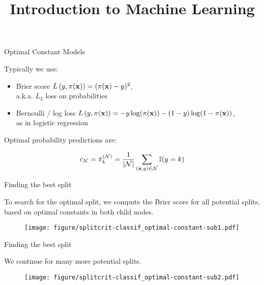 \documentclass[11pt,compress,t,notes=noshow, xcolor=table]{beamer}
\title{Introduction to Machine Learning}
\institute{\href{https://compstat-lmu.github.io/lecture_i2ml/}{compstat-lmu.github.io/lecture\_i2ml}}
\date{}
\begin{document}
\sloppy

\begin{vbframe}{Optimal Constant Models}

Typically we use: 

\begin{itemize}
\item Brier score $L\left(y, \pi(\mathbf{x})\right) = (\pi(\mathbf{x}) - y)^2$,\\ a.k.a. $L_2$ loss on probabilities
\item  Bernoulli / log loss $L\left(y, \pi(\mathbf{x})\right) = -y\log(\pi(\mathbf{x}))-(1-y)\log(1-\pi(\mathbf{x}))$, \\
as in logistic regression
\end{itemize}


Optimal probability predictions are:

$$c_{\mathcal{N}} = \hat\pi_k^{(\mathcal{N})} = \frac{1}{|\mathcal{N}|} \sum\limits_{(\mathbf{x},y) \in \mathcal{N}} \mathbb{I}(y = k)$$ 



\end{vbframe}


\begin{frame}[b]{Finding the best split}

To search for the optimal split, we compute the Brier score for all potential splits, based on optimal constants in both child nodes.

\vspace{0.5cm}

\begin{figure}[b]
    \centering
  \texttt{[image: figure/splitcrit-classif\_optimal-constant-sub1.pdf]}
\end{figure}


\end{frame}

\begin{frame}[noframenumbering]{Finding the best split}

We continue for many more potential splits.

\vspace{0.8cm}

\begin{figure}[b]
    \centering
  \texttt{[image: figure/splitcrit-classif\_optimal-constant-sub2.pdf]}
\end{figure}


\end{frame}
\end{document}
